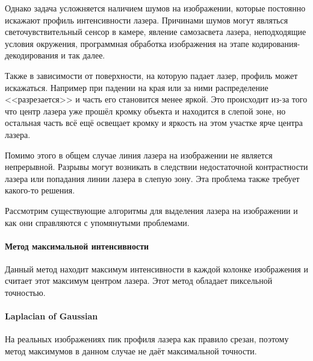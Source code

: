             Однако задача усложняется наличием шумов на изображении, которые постоянно искажают профиль интенсивности лазера. Причинами шумов могут являться светочувствительный сенсор в камере, явление самозасвета лазера, неподходящие условия окружения, программная обработка изображения на этапе кодирования-декодирования и так далее.
            
            Также в зависимости от поверхности, на которую падает лазер, профиль может искажаться. Например при падении на края или за ними распределение <<разрезается>> и часть его становится менее яркой. Это происходит из-за того что центр лазера уже прошёл кромку объекта и находится в слепой зоне, но остальная часть всё ещё освещает кромку и яркость на этом участке ярче центра лазера\cite{DavidenkoREFERAT}. 
            
            Помимо этого в общем случае линия лазера на изображении не является непрерывной. Разрывы могут возникать в следствии недостаточной контрастности лазера или попадания линии лазера в слепую зону. Эта проблема также требует какого-то решения.
            
            Рассмотрим существующие алгоритмы для выделения лазера на изображении и как они справляются с упомянутыми проблемами.
            
            \paragraph{Метод максимальной интенсивности}
                Данный метод находит максимум интенсивности в каждой колонке изображения и считает этот максимум центром лазера. Этот метод обладает пиксельной точностью.
            
            \paragraph{Laplacian of Gaussian}
                На реальных изображениях пик профиля лазера как правило срезан, поэтому метод максимумов в данном случае не даёт максимальной точности\cite{Molder2014}. 
                 
